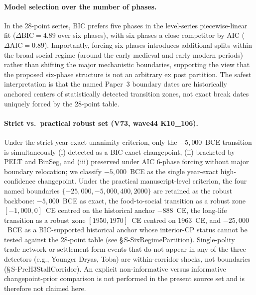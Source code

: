 \documentclass[11pt]{article}
\begin{document}
\paragraph{Model selection over the number of phases.}
In the 28-point series, BIC prefers five phases in the level-series piecewise-linear fit ($\Delta\mathrm{BIC}=4.89$ over six phases), with six phases a close competitor by AIC ($\Delta\mathrm{AIC}=0.89$).
Importantly, forcing six phases introduces additional splits within the broad social regime
(around the early medieval and early modern periods) rather than shifting the major mechanistic boundaries,
supporting the view that the proposed six-phase structure is not an arbitrary ex post partition.
The safest interpretation is that the named Paper~3 boundary dates are historically anchored centers
of statistically detected transition zones, not exact break dates uniquely forced by the 28-point table.

\paragraph{Strict vs.\ practical robust set (V73, wave44 K10\_106).} Under the strict year-exact unanimity criterion, only the $-5{,}000$~BCE transition is simultaneously (i) detected as a BIC-exact changepoint, (ii) bracketed by PELT and BinSeg, and (iii) preserved under AIC 6-phase forcing without major boundary relocation; we classify $-5{,}000$~BCE as the single year-exact high-confidence changepoint. Under the practical manuscript-level criterion, the four named boundaries $\{-25{,}000, -5{,}000, 400, 2000\}$ are retained as the robust backbone: $-5{,}000$~BCE as exact, the food-to-social transition as a robust zone $[-1{,}000, 0]$~CE centred on the historical anchor $-888$~CE, the long-life transition as a robust zone $[1950, 1970]$~CE centred on 1963~CE, and $-25{,}000$~BCE as a BIC-supported historical anchor whose interior-CP status cannot be tested against the 28-point table (see \S\,S-SixRegimePartition). Single-polity trade-network or settlement-form events that do not appear in any of the three detectors (e.g., Younger Dryas, Toba) are within-corridor shocks, not boundaries (\S\,S-PreH3StallCorridor). An explicit non-informative versus informative changepoint-prior comparison is not performed in the present source set and is therefore not claimed here.

\clearpage
\end{document}
